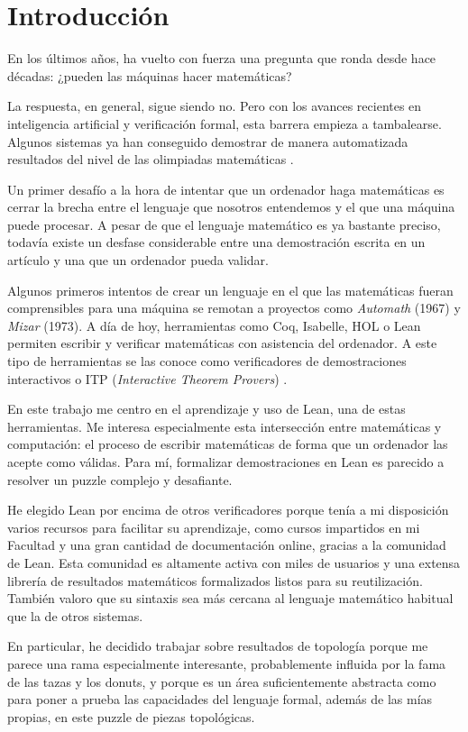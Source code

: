 \section{Introducción}

En los últimos años, ha vuelto con fuerza una pregunta que ronda desde hace décadas: ¿pueden las máquinas hacer matemáticas?

La respuesta, en general, sigue siendo no. Pero con los avances recientes en inteligencia artificial y verificación formal, esta barrera empieza a tambalearse. Algunos sistemas ya han conseguido demostrar de manera automatizada resultados del nivel de las olimpiadas matemáticas \cite{trinh2024solving}.

Un primer desafío a la hora de intentar que un ordenador haga matemáticas es cerrar la brecha entre el lenguaje que nosotros entendemos y el que una máquina puede procesar. A pesar de que el lenguaje matemático es ya bastante preciso, todavía existe un desfase considerable entre una demostración escrita en un artículo y una que un ordenador pueda validar.

Algunos primeros intentos de crear un lenguaje en el que las matemáticas fueran comprensibles para una máquina se remotan a proyectos como \textit{Automath} (1967) y \textit{Mizar} (1973). A día de hoy, herramientas como Coq, Isabelle, HOL o Lean permiten escribir y verificar matemáticas con asistencia del ordenador. A este tipo de herramientas se las conoce como verificadores de demostraciones interactivos o ITP (\textit{Interactive Theorem Provers}) \cite{geuvers2009proof}.

En este trabajo me centro en el aprendizaje y uso de Lean, una de estas herramientas. Me interesa especialmente esta intersección entre matemáticas y computación: el proceso de escribir matemáticas de forma que un ordenador las acepte como válidas. Para mí, formalizar demostraciones en Lean es parecido a resolver un puzzle complejo y desafiante.

He elegido Lean por encima de otros verificadores porque tenía a mi disposición varios recursos para facilitar su aprendizaje, como cursos impartidos en mi Facultad y una gran cantidad de documentación online, gracias a la comunidad de Lean. Esta comunidad es altamente activa con miles de usuarios y una extensa librería de resultados matemáticos formalizados listos para su reutilización. También valoro que su sintaxis sea más cercana al lenguaje matemático habitual que la de otros sistemas.

En particular, he decidido trabajar sobre resultados de topología porque me parece una rama especialmente interesante, probablemente influida por la fama de las tazas y los donuts, y porque es un área suficientemente abstracta como para poner a prueba las capacidades del lenguaje formal, además de las mías propias, en este puzzle de piezas topológicas.


